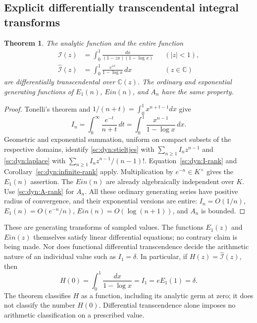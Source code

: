 \documentclass[11pt,a4paper]{article}
\newtheorem{theorem}{Theorem}[section]
\theoremstyle{definition}
\theoremstyle{remark}
\theoremstyle{plain}
\numberwithin{equation}{section}
\def\operatorname#1{#1}\def\mathrm#1{#1}}
\begin{document}
\subsection{Explicit differentially transcendental integral transforms}
\begin{theorem}\label{sc:dyn:integral-transforms}
The analytic function and the entire function
\begin{align}
 \mathcal I(z)&=\int_0^1\frac{dx}{(1-zx)(1-\log x)}
       &&(|z|<1),\label{sc:dyn:stieltjes}\\
 \widehat{\mathcal I}(z)&=\int_0^1\frac{e^{zx}}{1-\log x}\,dx
       &&(z\in\mathbb C)\label{sc:dyn:laplace}
\end{align}
are differentially transcendental over $\mathbb C(z)$.
The ordinary and exponential generating functions of $E_1(n)$,
$\operatorname{Ein}(n)$, and $A_n$ have the same property.
\end{theorem}
\begin{proof}
Tonelli's theorem and $1/(n+t)=\int_0^1x^{n+t-1}dx$ give
\[
 I_n=\int_0^\infty\frac{e^{-t}}{n+t}\,dt
     =\int_0^1\frac{x^{n-1}}{1-\log x}\,dx.
\]
Geometric and exponential summation, uniform on compact subsets of the
respective domains, identify \eqref{sc:dyn:stieltjes} with
$\sum_{n\ge1}I_nz^{n-1}$ and \eqref{sc:dyn:laplace} with
$\sum_{n\ge1}I_nz^{n-1}/(n-1)!$. Equation~\eqref{sc:dyn:I-rank} and
Corollary~\ref{sc:dyn:infinite-rank} apply. Multiplication by
$e^{-n}\in K^\times$ gives the $E_1(n)$ assertion. The
$\operatorname{Ein}(n)$ are already algebraically independent over $K$.
Use \eqref{sc:dyn:A-rank} for $A_n$. All these ordinary generating series
have positive radius of convergence, and their exponential versions
are entire: $I_n=O(1/n)$, $E_1(n)=O(e^{-n}/n)$,
$\operatorname{Ein}(n)=O(\log(n+1))$, and $A_n$ is bounded.
\end{proof}
These are generating transforms of sampled values. The functions
$E_1(z)$ and $\operatorname{Ein}(z)$ themselves satisfy linear
differential equations; no contrary claim is being made. Nor does
functional differential transcendence decide the arithmetic nature of
an individual value such as $I_1=\delta$.
In particular, if $H(z)=\widehat{\mathcal I}(z)$, then
\[
H(0)=\int_0^1\frac{dx}{1-\log x}=I_1=eE_1(1)=\delta.
\]
The theorem classifies $H$ as a function, including its analytic germ at
zero; it does not classify the number $H(0)$. Differential transcendence
alone imposes no arithmetic classification on a prescribed value.
\end{document}
